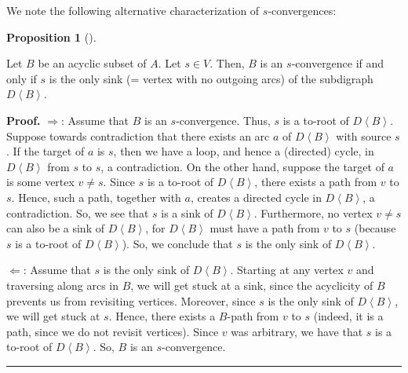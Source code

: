 \documentclass[numbers=enddot,12pt,final,onecolumn,notitlepage]{scrartcl}%
\theoremstyle{definition}
\newtheorem{prop}[theo]{Proposition}
\newenvironment{proposition}[1][]
{\begin{prop}[#1]\begin{leftbar}}
{\end{leftbar}\end{prop}}
\newenvironment{proof}[1][Proof]{\noindent\textbf{#1.} }{\ \rule{0.5em}{0.5em}}
\theoremstyle{plainsl}
\begin{document}
We note the following alternative characterization of $s$-convergences:

\begin{proposition}
Let $B$ be an acyclic subset of $A$. Let $s \in V$. Then, $B$ is an
$s$-convergence if and only if $s$ is the only sink (= vertex with no outgoing
arcs) of the subdigraph $D\left\langle B\right\rangle $.
\end{proposition}

\begin{proof}
$\Longrightarrow$: Assume that $B$ is an $s$-convergence. Thus, $s$ is a
to-root of $D\left\langle B\right\rangle $. Suppose towards contradiction that
there exists an arc $a$ of $D\left\langle B\right\rangle $ with source $s$. If
the target of $a$ is $s$, then we have a loop, and hence a (directed) cycle,
in $D\left\langle B\right\rangle $ from $s$ to $s$, a contradiction. On the
other hand, suppose the target of $a$ is some vertex $v\neq s$. Since $s$ is a
to-root of $D\left\langle B\right\rangle $, there exists a path from $v$ to
$s$. Hence, such a path, together with $a$, creates a directed cycle in
$D\left\langle B\right\rangle $, a contradiction. So, we see that $s$ is a
sink of $D\left\langle B\right\rangle $. Furthermore, no vertex $v\neq s$ can
also be a sink of $D\left\langle B\right\rangle $, for $D\left\langle
B\right\rangle $ must have a path from $v$ to $s$ (because $s$ is a to-root of
$D\left\langle B\right\rangle $). So, we conclude that $s$ is the only sink of
$D\left\langle B\right\rangle $.

\medskip$\Longleftarrow$: Assume that $s$ is the only sink of $D \left\langle
B \right\rangle $. Starting at any vertex $v$ and traversing along arcs in
$B$, we will get stuck at a sink, since the acyclicity of $B$ prevents us from
revisiting vertices. Moreover, since $s$ is the only sink of $D \left\langle B
\right\rangle $, we will get stuck at $s$. Hence, there exists a $B$-path from
$v$ to $s$ (indeed, it is a path, since we do not revisit vertices). Since $v$
was arbitrary, we have that $s$ is a to-root of $D \left\langle B
\right\rangle $. So, $B$ is an $s$-convergence.
\end{proof}
\end{document}
